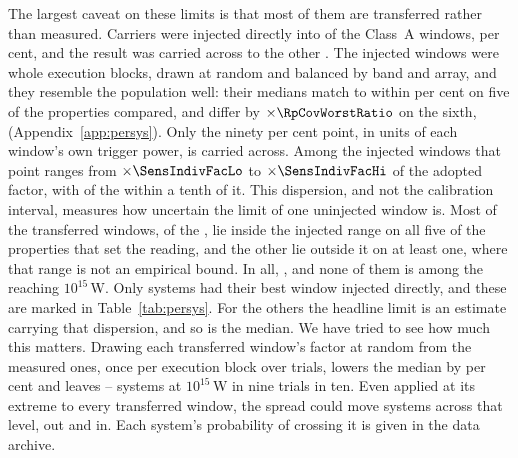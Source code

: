 The largest caveat on these limits is that most of them are
transferred rather than measured. Carriers were injected directly into
\SensNInj{} of the \NWinA{} Class~A windows, \SensNInjPct{} per cent, and the
result was carried across to the other \SensNTransfer. The injected windows
were whole execution blocks, drawn at random and balanced by band and array,
and they resemble the population well: their medians match to within
\RpCovOtherPct{} per cent on five of the \RpNAxis{} properties compared, and
differ by $\times\RpCovWorstRatio$ on the sixth, \RpCovWorstAxis{}
(Appendix~\ref{app:persys}). Only the ninety per cent point, in units of each
window's own trigger power, is carried across. Among the injected windows
that point ranges from $\times\SensIndivFacLo$ to $\times\SensIndivFacHi$ of
the adopted factor, with \NmDispNTenth{} of the \SensNInj{} within a tenth of
it. This dispersion, and not the calibration interval, measures how
uncertain the limit of one uninjected window is. Most of
the transferred windows, \NgNInterpWin{} of the \SensNTransfer, lie inside
the injected range on all five of the properties that set the reading, and
the other \NgNExtrapWin{} lie outside it on at least one, where that range is not an
empirical bound. In all, \NgExtrapTakeClause, and none of them is among the
\NSysEfifteen{} reaching $10^{15}$\,W. Only \SmcNMeasSys{} systems had their
best window injected directly, and these are marked in
Table~\ref{tab:persys}. For the others the headline limit is an estimate
carrying that dispersion, and so is the median. We have tried to see how much this
matters. Drawing each transferred window's factor at random from the measured
ones, once per execution block over \SvNTrial{} trials, lowers the median by
\SvRsMedShiftPct{} per cent and leaves \SvRsBlkNLo--\SvRsBlkNHi{} systems at
$10^{15}$\,W in nine trials in ten. Even applied at its extreme to every
transferred window, the spread could move \SvSprN{} systems across that
level, \SvSprNOut{} out and \SvSprNIn{} in. Each system's probability of
crossing it is given in the data archive.

